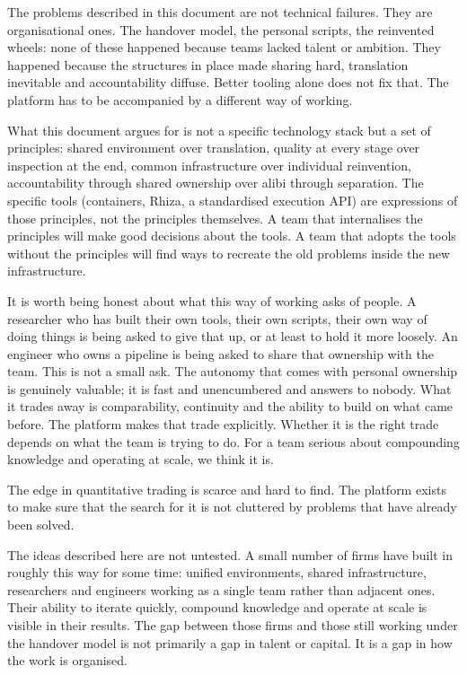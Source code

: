 \documentclass[
  11pt,
]{article}
\begin{document}
The problems described in this document are not technical failures. They
are organisational ones. The handover model, the personal scripts, the
reinvented wheels: none of these happened because teams lacked talent
or ambition. They happened because the structures in place made sharing
hard, translation inevitable and accountability diffuse. Better tooling
alone does not fix that. The platform has to be accompanied by a
different way of working.

What this document argues for is not a specific technology stack but a
set of principles: shared environment over translation, quality at every
stage over inspection at the end, common infrastructure over individual
reinvention, accountability through shared ownership over alibi through
separation. The specific tools (containers, Rhiza, a standardised
execution API) are expressions of those principles, not the
principles themselves. A team that internalises the principles will make
good decisions about the tools. A team that adopts the tools without the
principles will find ways to recreate the old problems inside the new
infrastructure.

It is worth being honest about what this way of working asks of people.
A researcher who has built their own tools, their own scripts, their own
way of doing things is being asked to give that up, or at least to
hold it more loosely. An engineer who owns a pipeline is being asked to
share that ownership with the team. This is not a small ask. The
autonomy that comes with personal ownership is genuinely valuable; it is
fast and unencumbered and answers to nobody. What it trades away is
comparability, continuity and the ability to build on what came before.
The platform makes that trade explicitly. Whether it is the right trade
depends on what the team is trying to do. For a team serious about
compounding knowledge and operating at scale, we think it is.

The edge in quantitative trading is scarce and hard to find. The
platform exists to make sure that the search for it is not cluttered by
problems that have already been solved.

The ideas described here are not untested. A small number of firms have
built in roughly this way for some time: unified environments, shared
infrastructure, researchers and engineers working as a single team
rather than adjacent ones. Their ability to iterate quickly, compound
knowledge and operate at scale is visible in their results. The gap
between those firms and those still working under the handover model is
not primarily a gap in talent or capital. It is a gap in how the work
is organised.
\end{document}
